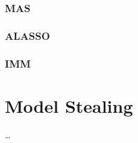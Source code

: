\subsubsection{MAS}

\subsubsection{ALASSO}
\subsubsection{IMM}



\section{Model Stealing}
\label{sec:Related_work:Model_Stealing}

\dots
